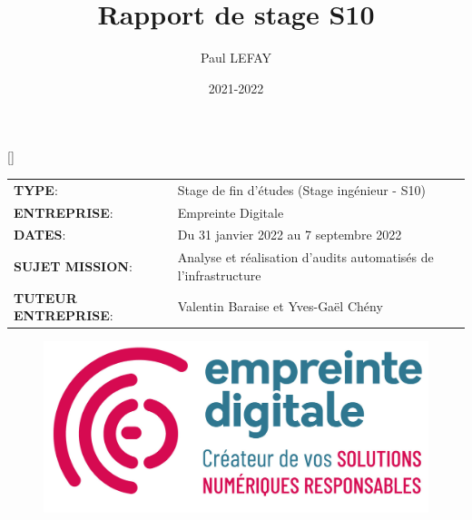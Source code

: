 \documentclass[12pt]{article}
\title{Rapport de stage S10}
\author{Paul LEFAY}
\date{2021-2022}
\begin{document}
\cfoot{\thepage}

\renewcommand{\headrulewidth}{0.4pt}
\renewcommand{\footrulewidth}{0.4pt}
\renewcommand{\contentsname}{Table des matières}
\renewcommand{\listfigurename}{}
\renewcommand{\listtablename}{}
\renewcommand{\thebibliography}{}
\renewcommand{\glossarysection}[2][]{}
\renewcommand{\partname}{Partie}
\patchcmd{\thebibliography}{\section*{\refname}}{}{}{}
[\refname]{}

\makeatletter
\preto{\@verbatim}{\topsep=0pt \partopsep=0pt }
\makeatother
{}

\maketitle
\thispagestyle{empty}
\begin{center}
	\begin{tabular}{ m{5cm} m{11.5cm} }
	\textbf{TYPE}: & \mbox{\ooalign{$\checkmark$\cr\hidewidth$\square$\hidewidth\cr}}  Stage de fin d'études (Stage ingénieur - S10) \\
   \textbf{ENTREPRISE}:  & Empreinte Digitale \\
   \textbf{DATES}: & Du 31 janvier 2022 au 7 septembre 2022 \\
   \textbf{SUJET MISSION}: & Analyse et réalisation d'audits automatisés de l'infrastructure \\
   \textbf{TUTEUR ENTREPRISE}:  & Valentin Baraise et Yves-Gaël Chény \\
 \end{tabular}
\end{center}

\begin{figure}[!ht]
    \centering
    \includegraphics[scale=0.8]{src/logo_ed.png}
    \label{fig:ed_logo}
\end{figure}
\end{document}
